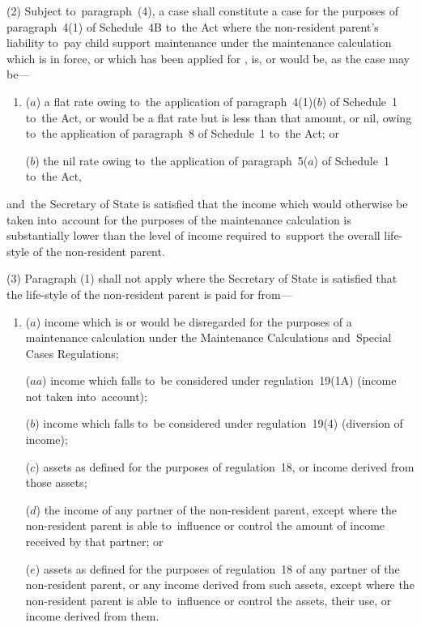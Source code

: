 \documentclass[12pt,a4paper]{article}
\begin{document}
(2) Subject to~paragraph~(4), a case shall constitute a case for the purposes of paragraph~4(1) of Schedule~4B to~the Act where the non-resident parent’s liability to~pay child support maintenance under the maintenance calculation which is in force, or which has been applied for%
, is, or would be, as the case may be—
\begin{enumerate}\item[]
($a$) a flat rate owing to~the application of paragraph~4(1)($b$)  of Schedule~1 to~the Act, or would be a flat rate but is less than that amount, or nil, owing to~the application of paragraph~8 of Schedule~1 to~the Act; or

($b$) the nil rate owing to~the application of paragraph~5($a$)  of Schedule~1 to~the Act,
\end{enumerate}
and~the Secretary of State is satisfied that the income which would otherwise be taken into~account for the purposes of the maintenance calculation is substantially lower than the level of income required to~support the overall life-style of the non-resident parent.

(3) Paragraph (1) shall not apply where the Secretary of State is satisfied that the life-style of the non-resident parent is paid for from—
\begin{enumerate}\item[]
($a$) income which is or would be disregarded for the purposes of a maintenance calculation under the Maintenance Calculations and~Special Cases Regulations;

($aa$) income which falls to~be considered under regulation~19(1A) (income not taken into~account);

($b$) income which falls to~be considered under regulation~19(4) (diversion of income);

($c$) assets as defined for the purposes of regulation~18, or income derived from those assets;

($d$) the income of any partner of the non-resident parent, except where the non-resident parent is able to~influence or control the amount of income received by that partner; or

($e$) assets as defined for the purposes of regulation~18 of any partner of the non-resident parent, or any income derived from such assets, except where the non-resident parent is able to~influence or control the assets, their use, or income derived from them.
\end{enumerate}
\end{document}
